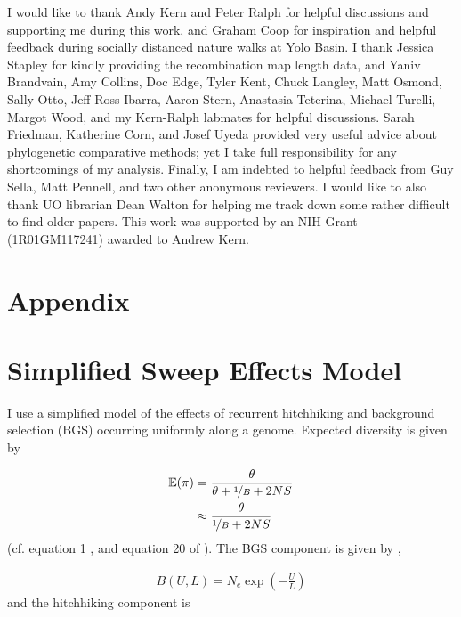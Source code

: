 \documentclass[11pt]{article}
\newcommand{\E}{\mathbb{E}}
\begin{document}
I would like to thank Andy Kern and Peter Ralph for helpful discussions and
supporting me during this work, and Graham Coop for inspiration and helpful
feedback during socially distanced nature walks at Yolo Basin. I thank Jessica
Stapley for kindly providing the recombination map length data, and Yaniv
Brandvain, Amy Collins, Doc Edge, Tyler Kent, Chuck Langley, Matt Osmond, Sally
Otto, Jeff Ross-Ibarra, Aaron Stern, Anastasia Teterina, Michael Turelli,
Margot Wood, and my Kern-Ralph labmates for helpful discussions. Sarah
Friedman, Katherine Corn, and Josef Uyeda provided very useful advice about
phylogenetic comparative methods; yet I take full responsibility for any
shortcomings of my analysis. Finally, I am indebted to helpful feedback from
Guy Sella, Matt Pennell, and two other anonymous reviewers. I would like to
also thank UO librarian Dean Walton for helping me track down some rather
difficult to find older papers. This work was supported by an NIH Grant
(1R01GM117241) awarded to Andrew Kern.

\section*{Appendix}

\setcounter{table}{0}
\renewcommand{\theequation}{A\arabic{equation}}
\setcounter{section}{0}
\renewcommand{\thesection}{A\arabic{section}}
\setcounter{figure}{0}
\renewcommand{\thefigure}{A\arabic{figure}}


\section{Simplified Sweep Effects Model}
\label{app:sweep}

I use a simplified model of the effects of recurrent hitchhiking and background
selection (BGS) occurring uniformly along a genome. Expected diversity is given
by

\begin{align}
  \E(\pi) &= \frac{\theta}{\theta + \nicefrac{1}{B} + 2NS} \\
          &\approx \frac{\theta}{\nicefrac{1}{B} + 2NS} 
\end{align}
%
(cf. equation 1 \cite{Elyashiv2016-vt}, and equation 20 of \cite{Coop2012-cd}).
The BGS component is given by \textcite{Hudson1995-xc},

\begin{align}
  B(U, L) = N_e \exp\left(-\frac{U}{L}\right)
\end{align}
%
and the hitchhiking component is
\end{document}
